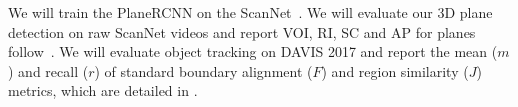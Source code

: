 We will train the PlaneRCNN \cite{liu2019planercnn} on the ScanNet~\cite{dai2017scannet}. We will evaluate our 3D plane detection on raw ScanNet videos and report VOI, RI, SC and AP for planes follow~\cite{liu2019planercnn}. 
We will evaluate object tracking on DAVIS 2017 \cite{pont2017} and report the mean ($m$)
and recall ($r$) of standard boundary alignment ($F$) and region similarity ($J$) metrics, which are detailed in \cite{perazzi2016benchmark}. %